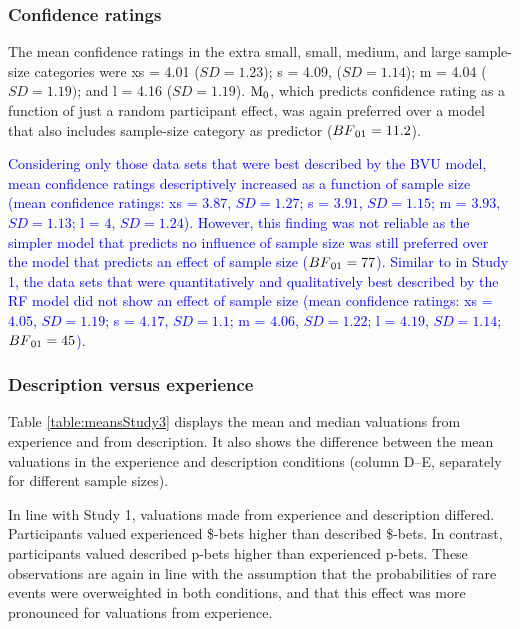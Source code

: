 \documentclass[a4paper, man, natbib, floatsintext]{apa6} %
\begin{document}
\subsubsection{Confidence ratings}
The mean confidence ratings in the extra small, small, medium, and large sample-size categories were xs = 4.01 ($SD = 1.23$); s = 4.09, ($SD = 1.14$); m = 4.04 ($SD = 1.19)$; and l = 4.16 ($SD = 1.19$). $\mathrm{M}\textsubscript{0}$, which predicts confidence rating as a function of just a random participant effect, was again preferred over a model that also includes sample-size category as predictor ($BF\textsubscript{01} = 11.2$). 

\textcolor{blue}{Considering only those data sets that were best described by the BVU model, mean confidence ratings descriptively increased as a function of  sample size (mean confidence ratings: xs = $3.87$, $SD = 1.27$; s = $3.91$, $SD = 1.15$; m = $3.93$, $SD = 1.13$; l = $4$, $SD = 1.24$). %
However, this finding was not reliable as the simpler model that predicts no influence of sample size was still preferred over the model that predicts an effect of sample size ($BF\textsubscript{01} = 77$). Similar to in Study 1, the data sets that were quantitatively and qualitatively best described by the RF model did not show an effect of sample size (mean confidence ratings: xs = $4.05$, $SD = 1.19$; s = $4.17$, $SD = 1.1$; m = $4.06$, $SD = 1.22$; l = $4.19$, $SD = 1.14$; $BF\textsubscript{01} = 45$).
}
\subsubsection{Description versus experience}

Table \ref{table:meansStudy3} displays the mean and median valuations from experience and from description. It also shows the difference between the mean valuations in the experience and description conditions (column D--E, separately for different sample sizes). 

In line with Study 1, valuations made from experience and description differed. Participants valued experienced \$-bets higher than described \$-bets. In contrast, participants valued described p-bets higher than experienced p-bets. These observations are again in line with the assumption that the probabilities of rare events were overweighted in both conditions, and that this effect was more pronounced for valuations from experience.
\end{document}
